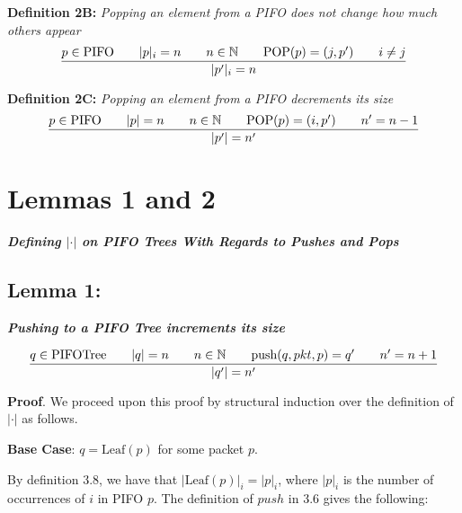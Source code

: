\documentclass{article}
\begin{document}
\noindent \textbf{Definition 2B:} \textit{Popping an element from a PIFO does not change how much others appear}
$$\frac{p \in \text{PIFO}  \hspace{0.7cm} |p|_i = n \hspace{0.7cm} n \in \mathbb{N} \hspace{0.7cm} \text{POP}(p) = (j, p') \hspace{0.7cm} i \neq j}{|p'|_i = n}$$

\noindent \textbf{Definition 2C:} \textit{Popping an element from a PIFO decrements its size}
$$\frac{p \in \text{PIFO}  \hspace{0.7cm} |p| = n \hspace{0.7cm} n \in \mathbb{N} \hspace{0.7cm} \text{POP}(p) = (i, p') \hspace{0.7cm} n' = n-1}{|p'| = n'}$$\newpage

\section{Lemmas 1 and 2}
\noindent \textbf{\textit{Defining $|\cdot|$ on PIFO Trees With Regards to Pushes and Pops}}\newline

\subsection{Lemma 1:}

\noindent \textbf{\textit{Pushing to a PIFO Tree increments its size}}

$$\frac{q \in \text{PIFOTree} \hspace{0.7cm} |q| = n \hspace{0.7cm} n \in \mathbb{N} \hspace{0.7cm} \text{push}(q, pkt, p) = q' \hspace{0.7cm} n' = n+1}{|q'| = n'}$$

\noindent \textbf{Proof}. We proceed upon this proof by structural induction over the definition of $|\cdot|$ as follows.\newline

\noindent \textbf{Base Case}: $q = \text{Leaf}(p)$ for some packet $p$.\newline

\noindent By definition 3.8, we have that $|\text{Leaf}(p)|_i = |p|_i$, where $|p|_i$ is the number of occurrences of $i$ in PIFO $p$. The definition of $push$ in 3.6 gives the following:
\end{document}

